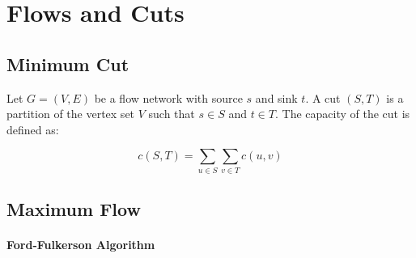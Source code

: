 \section{Flows and Cuts}

\subsection{Minimum Cut}

Let \( G = (V, E) \) be a flow network with source \( s \) and sink \( t \). A cut \( (S, T) \) is a partition of the vertex set \( V \) such that \( s \in S \) and \( t \in T \). The capacity of the cut is defined as:

\begin{equation*}
    c(S, T) = \sum_{u \in S} \sum_{v \in T} c(u, v)
\end{equation*}

\subsection{Maximum Flow}
\paragraph{Ford-Fulkerson Algorithm}
